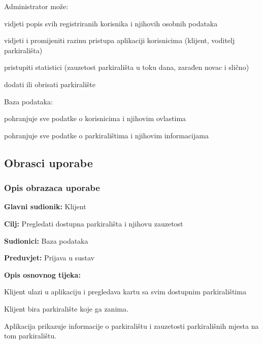 {\begin{packed_enum}
		\item {Administrator može:}
		\begin{packed_item}
			\item {vidjeti popis svih registriranih korisnika i njihovih osobnih podataka}
			\item {vidjeti i promijeniti razinu pristupa aplikaciji korisnicima (klijent, voditelj parkirališta)}
			\item {pristupiti statistici (zauzetost parkirališta u toku dana, zarađen novac i slično)}
			\item {dodati ili obrisati parkiralište}
		\end{packed_item}
		\item {Baza podataka:}
		\begin{packed_item}
			\item {pohranjuje sve podatke o korisnicima i njihovim ovlastima}
			\item {pohranjuje sve podatke o parkiralištima i njihovim informacijama}
		\end{packed_item}
	\end{packed_enum}



\subsection{Obrasci uporabe}


\subsubsection{Opis obrazaca uporabe}

\noindent {}
\begin{packed_item}
	
	\item \textbf{Glavni sudionik: }Klijent
	\item  \textbf{Cilj:} Pregledati dostupna parkirališta i njihovu zauzetost
	\item  \textbf{Sudionici:} Baza podataka
	\item  \textbf{Preduvjet:} Prijava u sustav
	\item  \textbf{Opis osnovnog tijeka:}
	
	\item[] \begin{packed_enum}
		
		\item Klijent ulazi u aplikaciju i pregledava kartu sa svim dostupnim parkiralištima
		\item Klijent bira parkiralište koje ga zanima.
		\item Aplikacija prikazuje informacije o parkiralištu i zauzetosti parkirališnih mjesta na tom parkiralištu.
		

\end{packed_enum}
\end{packed_item}}
